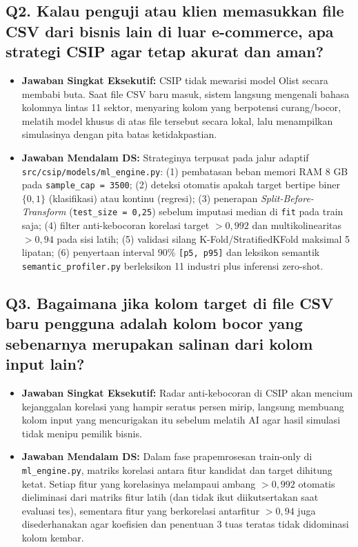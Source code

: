 \documentclass[11pt,a4paper,oneside]{book}
\newcommand{\code}[1]{{\small\nolinkurl{#1}}}
\begin{document}
\subsection*{Q2. Kalau penguji atau klien memasukkan file CSV dari bisnis lain di luar e-commerce, apa strategi CSIP agar tetap akurat dan aman?}
\begin{itemize}
  \item \textbf{Jawaban Singkat Eksekutif:} CSIP tidak mewarisi model Olist secara membabi buta. Saat file CSV baru masuk, sistem langsung mengenali bahasa kolomnya lintas 11 sektor, menyaring kolom yang berpotensi curang/bocor, melatih model khusus di atas file tersebut secara lokal, lalu menampilkan simulasinya dengan pita batas ketidakpastian.
  \item \textbf{Jawaban Mendalam DS:} Strateginya terpusat pada jalur adaptif \code{src/csip/models/ml_engine.py}: (1) pembatasan beban memori RAM 8 GB pada \code{sample_cap = 3500}; (2) deteksi otomatis apakah target bertipe biner $\{0,1\}$ (klasifikasi) atau kontinu (regresi); (3) penerapan \emph{Split-Before-Transform} (\code{test_size = 0,25}) sebelum imputasi median di \code{fit} pada train saja; (4) filter anti-kebocoran korelasi target $> 0{,}992$ dan multikolinearitas $> 0{,}94$ pada sisi latih; (5) validasi silang K-Fold/StratifiedKFold maksimal 5 lipatan; (6) penyertaan interval 90\% \code{[p5, p95]} dan leksikon semantik \code{semantic_profiler.py} berleksikon 11 industri plus inferensi zero-shot.
\end{itemize}

\subsection*{Q3. Bagaimana jika kolom target di file CSV baru pengguna adalah kolom bocor yang sebenarnya merupakan salinan dari kolom input lain?}
\begin{itemize}
  \item \textbf{Jawaban Singkat Eksekutif:} Radar anti-kebocoran di CSIP akan mencium kejanggalan korelasi yang hampir seratus persen mirip, langsung membuang kolom input yang mencurigakan itu sebelum melatih AI agar hasil simulasi tidak menipu pemilik bisnis.
  \item \textbf{Jawaban Mendalam DS:} Dalam fase prapemrosesan train-only di \code{ml_engine.py}, matriks korelasi antara fitur kandidat dan target dihitung ketat. Setiap fitur yang korelasinya melampaui ambang \textbf{$> 0{,}992$} otomatis dieliminasi dari matriks fitur latih (dan tidak ikut diikutsertakan saat evaluasi tes), sementara fitur yang berkorelasi antarfitur $> 0{,}94$ juga disederhanakan agar koefisien dan penentuan 3 tuas teratas tidak didominasi kolom kembar.
\end{itemize}
\end{document}
